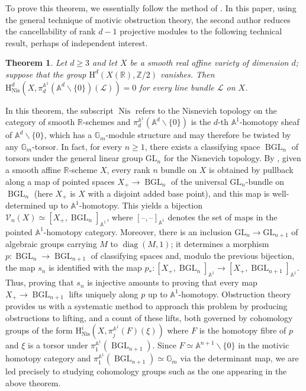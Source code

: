 \documentclass[11pt,leqno]{amsart}
\newcommand{\GL}{{\mathrm{GL}}}
\renewcommand{\1}{{\rm 1\hspace*{-0.4ex}%
\rule{0.1ex}{1.52ex}\hspace*{0.2ex}}}
\renewcommand{\Lc}{{\mathcal L}}
\newcommand{\Nis}{{\operatorname{Nis}}}
\newcommand{\Hr}{{\mathrm {H}}}
\newcommand{\<}[1]{{\langle}#1 {\rangle}}
\newcommand{\Rb}{\mathbb{R}}
\newcommand{\Zb}{\mathbb{Z}}
\newcommand{\Abb}{\mathbb{A}}
\newcommand{\BGL}{\operatorname{BGL}}
\newcounter{intro}
\theoremstyle{plain}
\newtheorem{thmintro}{Theorem}
\theoremstyle{definition}
\theoremstyle{remark}
\numberwithin{equation}{section}
\begin{document}
To prove this theorem, we essentially follow the method of \cite{faselSuslinsCancellationConjecture2025}. In this paper, using the general technique of motivic obstruction theory, the second author reduces the cancellability of rank $d-1$ projective modules to the following technical result, perhaps of independent interest.

\begin{thmintro}
Let $d\geq 3$ and let $X$ be a smooth real affine variety of dimension $d$; suppose that the group $\Hr^d(X(\Rb),\Zb/2)$ vanishes. Then $\Hr_\Nis^d(X,\pi_d^{\Abb^1}(\Abb^d\smallsetminus \{0\})(\Lc))=0$ for every line bundle $\Lc$ on $X$.
\end{thmintro}

In this theorem, the subscript $\Nis$ refers to the Nisnevich topology on the category of smooth $\Rb$-schemes and $\pi_d^{\Abb^1}(\Abb^d\smallsetminus \{0\})$ is the $d$-th $\Abb^1$-homotopy sheaf of $\Abb^d\smallsetminus \{0\}$, which has a $\mathbb{G}_m$-module structure and may therefore be twisted by any $\mathbb{G}_m$-torsor. In fact, for every $n\geq 1$, there exists a classifying space $\BGL_n$ of torsors under the general linear group $\GL_n$ for the Nisnevich topology. By \cite{asokAffineRepresentabilityResults2017a}, given a smooth affine $\Rb$-scheme $X$, every rank $n$ bundle on $X$ is obtained by pullback along a map of pointed spaces $X_+\rightarrow\BGL_n$ of the universal $\GL_n$-bundle on $\BGL_n$ (here $X_+$ is $X$ with a disjoint added base point), and this map is well-determined up to $\Abb^1$-homotopy. This yields a bijection $\mathscr{V}_n(X)\simeq[X_+,\BGL_n]_{\Abb^1}$, where $[\text{--},\text{--}]_{\Abb^1}$ denotes the set of maps in the pointed $\Abb^1$-homotopy category. Moreover, there is an inclusion $\GL_n\rightarrow\GL_{n+1}$ of algebraic groups carrying $M$ to $\operatorname{diag}(M,1)$; it determines a morphism $p:\BGL_n\rightarrow\BGL_{n+1}$ of classifying spaces and, modulo the previous bijection, the map $s_n$ is identified with the map $p_*:[X_+,\BGL_n]_{\Abb^1}\rightarrow[X_+,\BGL_{n+1}]_{\Abb^1}$. Thus, proving that $s_n$ is injective amounts to proving that every map $X_+\rightarrow\BGL_{n+1}$ lifts uniquely along $p$ up to $\Abb^1$-homotopy. Obstruction theory provides us with a systematic method to approach this problem by producing obstructions to lifting, and a count of these lifts, both governed by cohomology groups of the form $\Hr_\Nis^i(X,\pi_j^{\Abb^1}(F)(\xi))$ where $F$ is the homotopy fibre of $p$ and $\xi$ is a torsor under $\pi_1^{\Abb^1}(\BGL_{n+1})$. Since $F\simeq\Abb^{n+1}\smallsetminus \{0\}$ in the motivic homotopy category and $\pi_1^{\Abb^1}(\BGL_{n+1})\simeq\mathbb{G}_m$ via the determinant map, we are led precisely to studying cohomology groups such as the one appearing in the above theorem.
\end{document}
